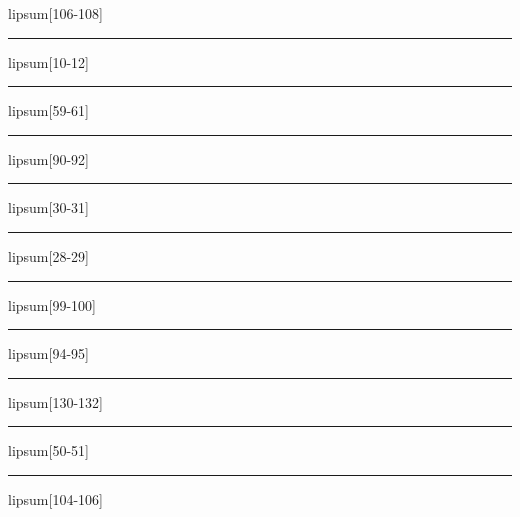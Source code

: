 \documentclass[11pt,a4paper]{article}
\begin{document}
lipsum[106-108]

\begin{simplewrap}
  \textcolor{magenta!27}{\rule{3.5cm}{7.6cm}}
\end{simplewrap}
lipsum[10-12]

\begin{simplewrap}
  \textcolor{magenta!22}{\rule{5.4cm}{5.7cm}}
\end{simplewrap}
lipsum[59-61]

\begin{simplewrap}
  \textcolor{yellow!35}{\rule{4.0cm}{8.9cm}}
\end{simplewrap}
lipsum[90-92]

\begin{simplewrap}
  \textcolor{pink!53}{\rule{5.9cm}{6.3cm}}
\end{simplewrap}
lipsum[30-31]

\begin{simplewrap}
  \textcolor{teal!21}{\rule{4.7cm}{9.9cm}}
\end{simplewrap}
lipsum[28-29]

\begin{simplewrap}
  \textcolor{lime!56}{\rule{5.4cm}{5.5cm}}
\end{simplewrap}
lipsum[99-100]

\begin{simplewrap}
  \textcolor{yellow!26}{\rule{3.1cm}{5.5cm}}
\end{simplewrap}
lipsum[94-95]

\begin{simplewrap}
  \textcolor{brown!49}{\rule{3.9cm}{8.8cm}}
\end{simplewrap}
lipsum[130-132]

\begin{simplewrap}
  \textcolor{olive!30}{\rule{4.2cm}{4.4cm}}
\end{simplewrap}
lipsum[50-51]

\begin{simplewrap}
  \textcolor{pink!53}{\rule{5.2cm}{3.4cm}}
\end{simplewrap}
lipsum[104-106]
\end{document}
